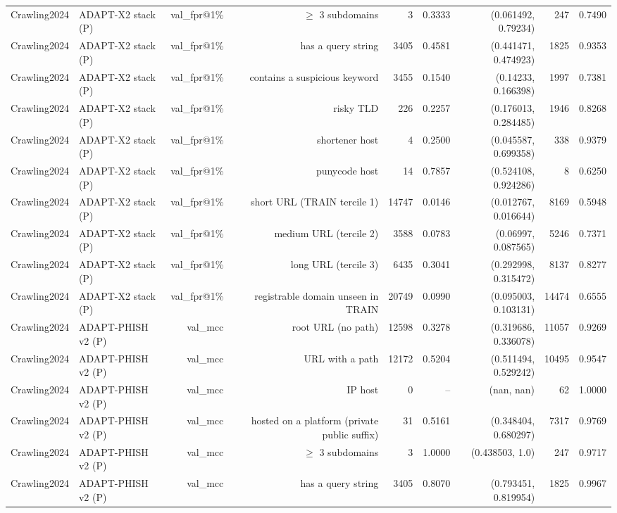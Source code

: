 \begin{table}[t]
\begin{tabular}{llrrrrrrr}
Crawling2024 & ADAPT-X2 stack (P) & val\_fpr@1\% & $\geq$ 3 subdomains & 3 & 0.3333 & (0.061492, 0.79234) & 247 & 0.7490 \\
Crawling2024 & ADAPT-X2 stack (P) & val\_fpr@1\% & has a query string & 3405 & 0.4581 & (0.441471, 0.474923) & 1825 & 0.9353 \\
Crawling2024 & ADAPT-X2 stack (P) & val\_fpr@1\% & contains a suspicious keyword & 3455 & 0.1540 & (0.14233, 0.166398) & 1997 & 0.7381 \\
Crawling2024 & ADAPT-X2 stack (P) & val\_fpr@1\% & risky TLD & 226 & 0.2257 & (0.176013, 0.284485) & 1946 & 0.8268 \\
Crawling2024 & ADAPT-X2 stack (P) & val\_fpr@1\% & shortener host & 4 & 0.2500 & (0.045587, 0.699358) & 338 & 0.9379 \\
Crawling2024 & ADAPT-X2 stack (P) & val\_fpr@1\% & punycode host & 14 & 0.7857 & (0.524108, 0.924286) & 8 & 0.6250 \\
Crawling2024 & ADAPT-X2 stack (P) & val\_fpr@1\% & short URL (TRAIN tercile 1) & 14747 & 0.0146 & (0.012767, 0.016644) & 8169 & 0.5948 \\
Crawling2024 & ADAPT-X2 stack (P) & val\_fpr@1\% & medium URL (tercile 2) & 3588 & 0.0783 & (0.06997, 0.087565) & 5246 & 0.7371 \\
Crawling2024 & ADAPT-X2 stack (P) & val\_fpr@1\% & long URL (tercile 3) & 6435 & 0.3041 & (0.292998, 0.315472) & 8137 & 0.8277 \\
Crawling2024 & ADAPT-X2 stack (P) & val\_fpr@1\% & registrable domain unseen in TRAIN & 20749 & 0.0990 & (0.095003, 0.103131) & 14474 & 0.6555 \\
Crawling2024 & ADAPT-PHISH v2 (P) & val\_mcc & root URL (no path) & 12598 & 0.3278 & (0.319686, 0.336078) & 11057 & 0.9269 \\
Crawling2024 & ADAPT-PHISH v2 (P) & val\_mcc & URL with a path & 12172 & 0.5204 & (0.511494, 0.529242) & 10495 & 0.9547 \\
Crawling2024 & ADAPT-PHISH v2 (P) & val\_mcc & IP host & 0 & -- & (nan, nan) & 62 & 1.0000 \\
Crawling2024 & ADAPT-PHISH v2 (P) & val\_mcc & hosted on a platform (private public suffix) & 31 & 0.5161 & (0.348404, 0.680297) & 7317 & 0.9769 \\
Crawling2024 & ADAPT-PHISH v2 (P) & val\_mcc & $\geq$ 3 subdomains & 3 & 1.0000 & (0.438503, 1.0) & 247 & 0.9717 \\
Crawling2024 & ADAPT-PHISH v2 (P) & val\_mcc & has a query string & 3405 & 0.8070 & (0.793451, 0.819954) & 1825 & 0.9967 \\

\end{tabular}
\end{table}
